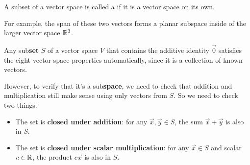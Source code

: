 \begin{definition}
  A subset of a vector space is called a  if it is
  a vector space on its own.

  \vspace{1em}

  For example, the span of these two vectors forms a planar subspace
  inside of the larger vector space \(\mathbb{R}^3\).

  \begin{center}
  \end{center}
\end{definition}



\begin{fact}
  Any sub\textbf{set} \(S\) of a vector space \(V\) that contains
  the additive identity \(\vec 0\) satisfies the eight
  vector space properties automatically, since it is a collection of known
  vectors.

  \vspace{1em}

  However, to verify that it's a sub\textbf{space}, we need to check that
  addition and multiplication still make sense using only vectors from \(S\).
  So we need to check two things:

  \begin{itemize}
  \item The set is \textbf{closed under addition}: for any \(\vec{x},\vec{y} \in S\), the sum \(\vec{x}+\vec{y}\) is also in \(S\).
  \item The set is \textbf{closed under scalar multiplication}: for any \(\vec{x} \in S\) and scalar \(c \in \mathbb{R}\), the product \(c\vec{x}\) is also in \(S\).
\end{itemize}
\end{fact}

